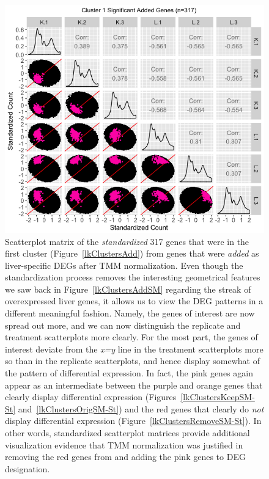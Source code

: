\documentclass{article}
\begin{document}
  \null
  \begin{figure}[t!]
  \centerline{\includegraphics[width=1\columnwidth]{../MakeFigures/lkClustersAddSM-St.jpg}}
  \caption{Scatterplot matrix of the \textit{standardized} 317 genes that were in the first cluster (Figure~\ref{lkClustersAdd}) from genes that were \textit{added} as liver-specific DEGs after TMM normalization. Even though the standardization process removes the interesting geometrical features we saw back in Figure~\ref{lkClustersAddSM} regarding the streak of overexpressed liver genes, it allows us to view the DEG patterns in a different meaningful fashion. Namely, the genes of interest are now spread out more, and we can now distinguish the replicate and treatment scatterplots more clearly. For the most part, the genes of interest deviate from the \textit{x=y} line in the treatment scatterplots more so than in the replicate scatterplots, and hence display somewhat of the pattern of differential expression. In fact, the pink genes again appear as an intermediate between the purple and orange genes that clearly display differential expression (Figures~\ref{lkClustersKeepSM-St} and~\ref{lkClustersOrigSM-St}) and the red genes that clearly do \textit{not} display differential expression (Figure~\ref{lkClustersRemoveSM-St}). In other words, standardized scatterplot matrices provide additional visualization evidence that TMM normalization was justified in removing the red genes from and adding the pink genes to DEG designation.
  \label{lkClustersAddSM-St}}
  \end{figure}
  
\end{document}
